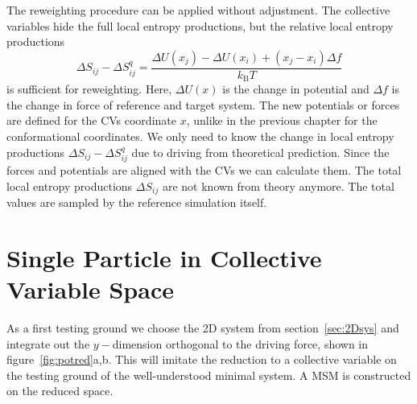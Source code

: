 The reweighting procedure can be applied without adjustment. The collective variables hide the full local entropy productions, but the relative local entropy productions
\begin{equation}
 \Delta S_{ij} - \Delta S_{ij}^q = \frac{ \Delta U(x_j) - \Delta U(x_i) + (x_j - x_i) \Delta f }{k_{\mathrm{B}} T}
 \end{equation}
 is sufficient for reweighting. Here, $\Delta U(x)$ is the change in potential and $\Delta f$ is the change in force of reference and target system. The new potentials or forces are defined for the CVs coordinate $x$, unlike in the previous chapter for the conformational coordinates.  We only need to know the change in local entropy productions $\Delta S_{ij} - \Delta S_{ij}^q$ due to driving from theoretical prediction. Since the forces and potentials are aligned with the CVs we can calculate them. The total local entropy productions $\Delta S_{ij}$ are not known from theory anymore. The total values are sampled by the reference simulation itself. 

\section{Single Particle in Collective Variable Space} 
As a first testing ground we choose the 2D system from section~\ref{sec:2Dsys} and integrate out the $y-$dimension orthogonal to the driving force, shown in figure~\ref{fig:potred}a,b. This will imitate the reduction to a collective variable on the testing ground of the well-understood minimal system. A MSM is constructed on the reduced space.

